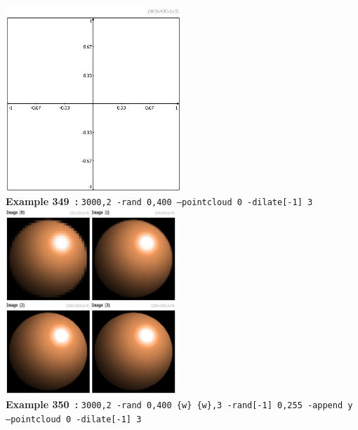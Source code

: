 \documentclass[a4paper,11pt,twoside]{book}
\begin{document}
\begin{center}\includegraphics[keepaspectratio=true,height=7cm,width=\textwidth]{img/gmic_def349.jpg}\\
{\footnotesize \textbf{Example 349~:} \texttt{3000,2 -rand 0,400 --pointcloud 0 -dilate[-1] 3}}
\\\includegraphics[keepaspectratio=true,height=7cm,width=\textwidth]{img/gmic_def350.jpg}\\
{\footnotesize \textbf{Example 350~:} \texttt{3000,2 -rand 0,400 \{w\} \{w\},3 -rand[-1] 0,255 -append y --pointcloud 0 -dilate[-1] 3}}
\end{center}
\end{document}
